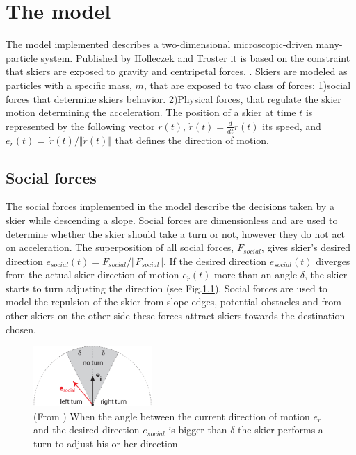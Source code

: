 \documentclass[12pt,a4paper,twoside]{book}
\begin{document}
\chapter{The model}\label{model}
The model implemented describes a two-dimensional microscopic-driven many-particle system. Published by Holleczek and Troster \cite{hol2012} it is based on the constraint that skiers are exposed to gravity and centripetal forces.
.
Skiers are modeled as particles with a specific mass, $m$, that are exposed to two class of forces: 
1)social forces that determine skiers behavior. 
2)Physical forces, that regulate the skier motion determining the acceleration. 
The position of a skier at time $t$ is represented by the following vector $r(t)$, $\dot{r}(t)=\frac{d}{dt}r(t)$ its speed, and $e_{\dot{r}}(t)=\ \dot{r}(t) / \Vert \dot{r}(t)\Vert$ that defines the direction of motion.

\section{Social forces}
The social forces implemented in the model describe the decisions taken by a skier while descending a slope. Social forces are dimensionless and are used to determine whether the skier should take a turn or not, however they do not act on acceleration. The superposition of all social forces, $F_{social}$, gives skier's desired direction  $e_{social}(t)=F_{social} / \Vert F_{social} \Vert$. If the desired direction $e_{social}(t)$ diverges from the actual skier direction of motion $e_{\dot{r}}(t)$ more than an angle ${\delta}$, the skier starts to turn adjusting the direction (see Fig.\ref{start_turn_pic}). Social forces are used to model the repulsion of the skier from slope edges, potential obstacles and from other skiers on the other side these forces attract skiers towards the destination chosen.

\begin{figure}[!ht]
  \begin{center}
    \includegraphics[width=0.4\textwidth]{images/start_turn_pic.eps}
    \caption{(From \cite{hol2012}) When the angle between the current direction of motion $e_{\dot{r}}$ and the desired direction $e_{social}$ is bigger than $\delta$ the skier performs a turn to adjust his or her direction}\label{start_turn_pic}
  \end{center}
\end{figure}
\end{document}

